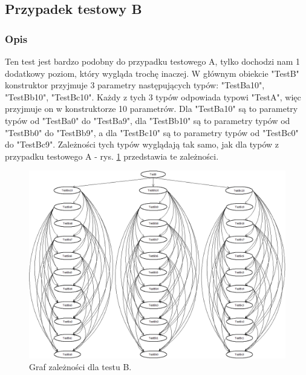 \documentclass[12pt]{article}
\begin{document}
\subsection{Przypadek testowy B}
\subsubsection{Opis}
Ten test jest bardzo podobny do przypadku testowego A, tylko dochodzi nam 1 dodatkowy poziom, który wygląda trochę inaczej. W głównym obiekcie "TestB" konstruktor przyjmuje 3 parametry następujących typów: "TestBa10", "TestBb10", "TestBc10". Każdy z tych 3 typów odpowiada typowi "TestA", więc przyjmuje on w konstruktorze 10 parametrów. Dla "TestBa10" są to parametry typów od "TestBa0" do "TestBa9", dla "TestBb10" są to parametry typów od "TestBb0" do "TestBb9", a dla "TestBc10" są to parametry typów od "TestBc0" do "TestBc9". Zależności tych typów wyglądają tak samo, jak dla typów z przypadku testowego A - rys. \ref{fig:testB} przedstawia te zależności. \\

\clearpage
\begin{figure}[h]
	\begin{center}
  		\includegraphics[width=\linewidth]{TestB.png}
  		\caption{Graf zależności dla testu B.}
  		\label{fig:testB}
	\end{center}
\end{figure}
\end{document}
